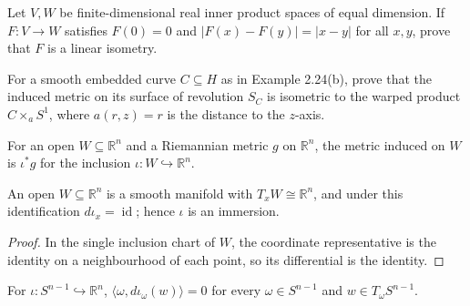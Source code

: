 \begin{exercise}\label{prob:distance-preserving-map-linear-isometry}
\leanok
Let $V,W$ be finite-dimensional real inner product spaces of equal dimension. If $F:V\to W$ satisfies $F(0)=0$ and $|F(x)-F(y)|=|x-y|$ for all $x,y$, prove that $F$ is a linear isometry.
\end{exercise}

\begin{exercise}\label{prob:surface-of-revolution-warped-product}
For a smooth embedded curve $C\subseteq H$ as in Example 2.24(b), prove that the induced metric on its surface of revolution $S_C$ is isometric to the warped product $C\times_aS^1$, where $a(r,z)=r$ is the distance to the $z$-axis.
\end{exercise}

\begin{definition}
\label{def:open-submanifold-metric}
\leanok
{}
For an open $W\subseteq\mathbb R^n$ and a Riemannian metric $g$ on $\mathbb R^n$, the metric induced on $W$ is $\iota^*g$ for the inclusion $\iota:W\hookrightarrow\mathbb R^n$.
\end{definition}

\begin{lemma}
\label{lem:mfderiv-open-inclusion}
\leanok
An open $W\subseteq\mathbb R^n$ is a smooth manifold with $T_xW\cong\mathbb R^n$, and under this identification $d\iota_x=\operatorname{id}$; hence $\iota$ is an immersion.
\end{lemma}

\begin{proof}
\leanok
\sketch In the single inclusion chart of $W$, the coordinate representative is the identity on a neighbourhood of each point, so its differential is the identity.
\end{proof}

\begin{lemma}
\label{lem:sphere-tangent-orthogonal-radius}
\leanok
{}
For $\iota:S^{n-1}\hookrightarrow\mathbb R^n$, $\langle\omega,d\iota_\omega(w)\rangle=0$ for every $\omega\in S^{n-1}$ and $w\in T_\omega S^{n-1}$.
\end{lemma}

